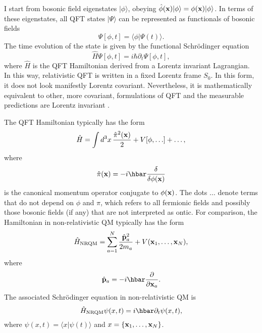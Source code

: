 \documentclass[12pt]{article}
\begin{document}
I start from bosonic field eigenstates $|\phi\rangle$, obeying $\hat{\phi}({\bf x})|\phi\rangle=\phi({\bf x})|\phi\rangle$. 
In terms of these eigenstates, all QFT states $|\Psi\rangle$ can be represented as functionals of bosonic fields 
\begin{equation}
 \Psi[\phi,t]=\langle\phi|\Psi(t)\rangle .
\end{equation}
The time evolution of the state is given by the functional Schr\"odinger equation 
\begin{equation}
 \hat{H}\Psi[\phi,t]=i\hbar\partial_t\Psi[\phi,t] ,
\end{equation}
where $\hat{H}$ is the QFT Hamiltonian derived from a Lorentz invariant Lagrangian.
In this way, relativistic QFT is written in a fixed Lorentz frame $S_0$. 
In this form, it does not look manifestly Lorentz covariant. Nevertheless, it is mathematically
equivalent to other, more covariant, formulations of QFT and the measurable predictions 
are Lorentz invariant \cite{hatfield}. 

The QFT Hamiltonian typically has the form
\begin{equation}\label{HQFT}
 \hat{H}=\int d^3x\, \frac{\hat{\pi}^2({\bf x})}{2}+V[\phi, \ldots] + \ldots ,
\end{equation}
where 
\begin{equation}
\hat{\pi}({\bf x})=-i\hbar\frac{\delta}{\delta\phi({\bf x})} 
\end{equation}
is the canonical momentum operator conjugate to $\phi({\bf x})$. The dots
$\ldots$ denote terms that do not depend on $\phi$ and $\hat{\pi}$, which refers to all fermionic fields 
and possibly those bosonic fields (if any) that are not interpreted as ontic.
For comparison, the Hamiltonian in non-relativistic QM typically has the form
\begin{equation}\label{Hpart}
 \hat{H}_{\rm NRQM}=\sum_{a=1}^N \frac{\hat{\bf p}_a^2}{2m_a}+V({\bf x}_1,\ldots,{\bf x}_N) ,
\end{equation}
where 
\begin{equation}
\hat{\bf p}_a=-i\hbar\frac{\partial}{\partial{\bf x}_a}.
\end{equation}
The associated Schr\"odinger equation in non-relativistic QM is 
\begin{equation}
\hat{H}_{\rm NRQM}\psi(x,t)=i\hbar\partial_t\psi(x,t) ,
\end{equation}
where $\psi(x,t)=\langle x|\psi(t)\rangle$ and $x=\{ {\bf x}_1,\ldots,{\bf x}_N\}$. 
\end{document}
